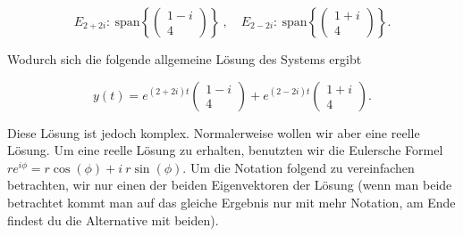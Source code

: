 \begin{solution}
    \vspace{1\baselineskip}

    \begin{equation*}
        E_{2+2i} : \ \text{span} \left\{ \begin{pmatrix}
            1-i \\ 4
        \end{pmatrix} \right\} \ , \quad 
        E_{2-2i} : \ \text{span} \left\{ \begin{pmatrix}
            1+i \\ 4
        \end{pmatrix} \right\}.
    \end{equation*}

    Wodurch sich die folgende allgemeine Lösung des Systems ergibt

    \begin{equation*}
        y(t) = e^{(2+2i)t} \begin{pmatrix}
            1-i \\ 4
        \end{pmatrix} + e^{(2-2i)t} \begin{pmatrix}
            1+i \\ 4
        \end{pmatrix}.
    \end{equation*}

    Diese Lösung ist jedoch komplex. Normalerweise wollen wir aber eine reelle Lösung. Um eine reelle Lösung zu erhalten, benutzten wir die Eulersche Formel \( r e^{i \phi} = r \cos(\phi) + i \ r \sin(\phi) \). Um die Notation folgend zu vereinfachen betrachten, wir nur einen der beiden Eigenvektoren der Lösung (wenn man beide betrachtet kommt man auf das gleiche Ergebnis nur mit mehr Notation, am Ende findest du die Alternative mit beiden). 


\end{solution}
